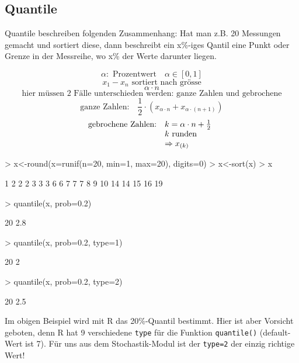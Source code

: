 \subsection{Quantile}
Quantile beschreiben folgenden Zusammenhang: Hat man z.B. 20 Messungen gemacht
und sortiert diese, dann beschreibt ein x\%-iges Qantil eine Punkt oder Grenze
in der Messreihe, wo x\% der Werte darunter liegen.

\[ \alpha: \text{ Prozentwert} \quad \alpha \in [0,1] \]
\[ x_1 - x_n \text{ sortiert nach grösse}  \]
\[ \alpha \cdot n \]
\[ \text{hier müssen 2 Fälle unterschieden werden: ganze Zahlen und gebrochene} \]
\[ \text{ganze Zahlen:} \quad \frac{1}{2} 
\cdot (x_{\alpha \cdot n} + x_{\alpha \cdot (n+1)}) \]
\[ \begin{array}{@{}@{}ll}
	\text{gebrochene Zahlen:} & k=\alpha \cdot n + \frac{1}{2} \\
	                          & k \text{ runden} \\
				  & \Rightarrow x_{(k)}
\end{array}\]

\begin{Schunk}
\begin{Sinput}
> x<-round(x=runif(n=20, min=1, max=20), digits=0)
> x<-sort(x)
> x
\end{Sinput}
\begin{Soutput}
 [1]  1  2  2  2  3  3  3  6  6  7  7  7  8  9 10 14 14 15 16 19
\end{Soutput}
\begin{Sinput}
> quantile(x, prob=0.2)
\end{Sinput}
\begin{Soutput}
20%
2.8 
\end{Soutput}
\begin{Sinput}
> quantile(x, prob=0.2, type=1)
\end{Sinput}
\begin{Soutput}
20%
  2 
\end{Soutput}
\begin{Sinput}
> quantile(x, prob=0.2, type=2)
\end{Sinput}
\begin{Soutput}
20%
2.5 
\end{Soutput}
\end{Schunk}
Im obigen Beispiel wird mit R das 20\%-Quantil bestimmt. Hier ist aber 
Vorsicht geboten, denn R hat 9 verschiedene \verb!type! für die Funktion
\verb!quantile()! (default-Wert ist 7). Für uns aus dem 
Stochastik-Modul ist der \verb!type=2! 
der einzig richtige Wert!

